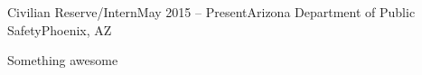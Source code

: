 
\def\PositionTitle{Civilian Reserve/Intern}
\def\PositionPeriod{May 2015 -- Present} %
\def\OrgName{Arizona Department of Public Safety}
\def\OrgLocation{Phoenix, AZ}


\begin{rExperience}{\PositionTitle}{\PositionPeriod}{\OrgName}{\OrgLocation}

  \item Something awesome

\end{rExperience}
